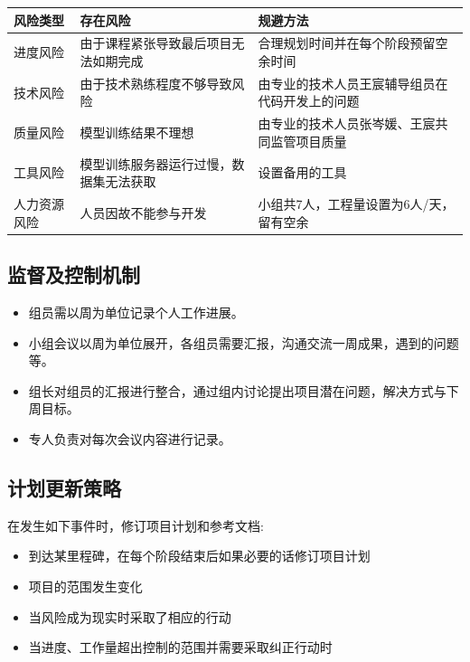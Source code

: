 \documentclass[
  hyperref, a4paper]{ctexart}
\providecommand{\tightlist}{%
  \setlength{\itemsep}{0pt}\setlength{\parskip}{0pt}}
\begin{document}
\begin{table}[H]
\small 
\begin{center}  
\begin{tabular}{|p{1.5cm}|p{3cm}|p{5cm}|}  
\hline  
风险类型 & 存在风险 & 规避方法  \\ \hline  
进度风险 & 由于课程紧张导致最后项目无法如期完成 & 合理规划时间并在每个阶段预留空余时间 \\ \hline  
技术风险 & 由于技术熟练程度不够导致风险 & 由专业的技术人员王宸辅导组员在代码开发上的问题 \\  \hline  
质量风险 & 模型训练结果不理想 & 由专业的技术人员张岑媛、王宸共同监管项目质量 \\  \hline  
工具风险 & 模型训练服务器运行过慢，数据集无法获取 & 设置备用的工具 \\  \hline  
人力资源风险 & 人员因故不能参与开发 & 小组共7人，工程量设置为6人/天，留有空余 \\  \hline  
\end{tabular}  
\end{center}  
\end{table}

\hypertarget{ux76d1ux7763ux53caux63a7ux5236ux673aux5236}{%
\subsection{监督及控制机制}\label{ux76d1ux7763ux53caux63a7ux5236ux673aux5236}}

\begin{itemize}
\tightlist
\item
  组员需以周为单位记录个人工作进展。
\item
  小组会议以周为单位展开，各组员需要汇报，沟通交流一周成果，遇到的问题等。
\item
  组长对组员的汇报进行整合，通过组内讨论提出项目潜在问题，解决方式与下周目标。
\item
  专人负责对每次会议内容进行记录。
\end{itemize}

\hypertarget{ux8ba1ux5212ux66f4ux65b0ux7b56ux7565}{%
\subsection{计划更新策略}\label{ux8ba1ux5212ux66f4ux65b0ux7b56ux7565}}

在发生如下事件时，修订项目计划和参考文档:

\begin{itemize}
\tightlist
\item
  到达某里程碑，在每个阶段结束后如果必要的话修订项目计划
\item
  项目的范围发生变化
\item
  当风险成为现实时采取了相应的行动
\item
  当进度、工作量超出控制的范围并需要采取纠正行动时
\end{itemize}
\end{document}

